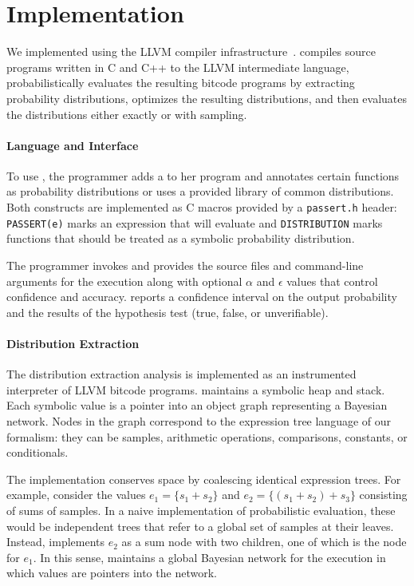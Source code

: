 \section{Implementation}
\label{passert:sec:implementation}

We implemented \tool using the LLVM compiler infrastructure~\cite{llvm}. \tool
compiles source programs written in C and C++ to the LLVM intermediate
language, probabilistically evaluates the resulting bitcode programs by extracting
probability distributions, optimizes the resulting distributions, and
then evaluates the \passert distributions either exactly or with sampling.

\paragraph{Language and Interface}

To use \tool, the programmer adds a \passert to her program and annotates
certain functions as probability distributions or uses a provided library of
common distributions. Both constructs are implemented as C macros provided by
a \texttt{passert.h} header: \texttt{PASSERT(e)} marks an expression that
\tool will evaluate and \texttt{DISTRIBUTION} marks functions
that should be treated as a symbolic probability distribution.

The programmer invokes \tool and provides the source files and command-line
arguments for the execution along with optional $\alpha$ and $\epsilon$ values
that control confidence and accuracy. \tool reports a confidence interval on
the output probability and the results of the hypothesis test (true, false, or
unverifiable).

\paragraph{Distribution Extraction}

The distribution extraction analysis is implemented as an instrumented
interpreter of LLVM bitcode programs. \tool maintains a symbolic heap and
stack. Each symbolic value is a pointer into an object graph representing a
Bayesian network. Nodes in the graph correspond to the expression tree language of
our formalism: they can be samples, arithmetic operations, comparisons,
constants, or conditionals.

The implementation conserves space by coalescing identical expression trees.
For example, consider the values
$e_1 = \{ s_1 + s_2 \}$ and $e_2 = \{ (s_1 + s_2) + s_3 \}$ consisting of sums of samples.
In a naive implementation of probabilistic evaluation, these would be independent trees
that refer to a global set of samples at their leaves.
Instead, \tool implements $e_2$ as a sum node with two
children, one of which is the node for $e_1$.
In this sense, \tool maintains a global Bayesian network for the
execution in which
values are pointers into the network.

